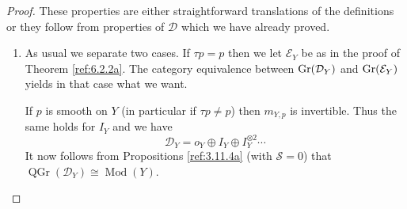 \documentclass{amsproc}
\def\Dscr{{\mathcal D}}
\def\Escr{{\mathcal E}}
\def\Sscr{{\mathcal S}}
\def\Gr{\mathop{\text{Gr}}}
\def\Qch{\operatorname {Mod}}
\let\oldtext\text
\def\text#1{\oldtext{\upshape #1}}
\DeclareMathOperator{\QGr}{QGr}
\theoremstyle{definition}
\theoremstyle{remark}
\numberwithin{equation}{section}
\numberwithin{table}{section}
\numberwithin{figure}{section}
\def\Gr{\mathop{\text{Gr}}}
\begin{document}
\begin{proof} These properties are either straightforward translations
  of the definitions or they follow from  properties of $\Dscr$
  which we have already proved. 
  \begin{enumerate}
\item As usual we separate two cases. If $\tau p=p$ then we 
let $\Escr_Y$ be as in the proof of Theorem \ref{ref:6.2.2a}. The
category equivalence between $\Gr(\Dscr_Y)$ and $\Gr(\Escr_Y)$ 
yields in that case what we want.

If  $p$ is smooth on $Y$ (in particular if $\tau p\neq p$) then 
$m_{Y,p}$ is invertible. Thus the same holds for $I_Y$ and we have
\[
\Dscr_Y=o_{Y}\oplus I_Y\oplus I_Y^{\otimes 2}\cdots
\]
It now follows from Propositions \ref{ref:3.11.4a} (with $\Sscr=0$) that
$\QGr(\Dscr_Y)\cong \Qch(Y)$. 


\end{enumerate}
\end{proof}
\end{document}
